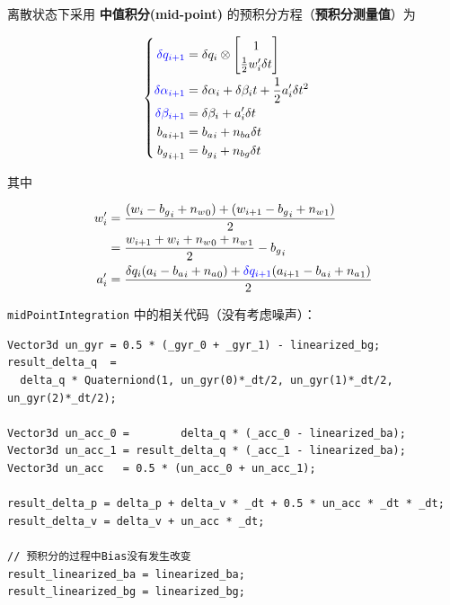 \documentclass[12pt,a4paper]{article}
\begin{document}
离散状态下采用 \textbf{中值积分(mid-point)} 的预积分方程（\textbf{预积分测量值}）为

\begin{equation}
\label{equ:preinte_measure}
\begin{cases}
\begin{aligned}
\color{blue}{\delta q_{i+1}} &= 
\delta q_{i} \otimes 
\begin{bmatrix} 1 \\ \frac{1}{2} w_{i}' \delta t \end{bmatrix} \\
\color{blue}{\delta\alpha_{i+1}} &= 
\delta\alpha_{i} + \delta\beta_{i}t + \frac{1}{2}a_{i}'\delta t^{2} \\
\color{blue}{\delta\beta_{i+1}} &= 
\delta\beta_{i}+a_{i}' \delta t \\
{b_a}_{i+1} &= {b_a}_i + n_{ba} \delta t \\
{b_g}_{i+1} &= {b_g}_i + n_{bg} \delta t
\end{aligned}
\end{cases}
\end{equation}

其中

\begin{equation}
\begin{aligned}
w_{i}' &= \frac{(w_i-{b_g}_i+{n_w}_0)+(w_{i+1}-{b_g}_i+{n_w}_1)}{2} \\
       &= \frac{w_{i+1}+w_{i}+{n_w}_0+{n_w}_1}{2}-{b_g}_i \\
a_{i}' &= \frac{
  \delta q_{i} (a_{i}-{b_a}_i+{n_a}_0)+
  {\color{blue}{\delta q_{i+1}}}(a_{i+1}-{b_a}_i+{n_a}_1)}{2}
\end{aligned}
\end{equation}

\verb|midPointIntegration| 中的相关代码（没有考虑噪声）：  

\begin{lstlisting}
Vector3d un_gyr = 0.5 * (_gyr_0 + _gyr_1) - linearized_bg;
result_delta_q  = 
  delta_q * Quaterniond(1, un_gyr(0)*_dt/2, un_gyr(1)*_dt/2, un_gyr(2)*_dt/2);

Vector3d un_acc_0 =        delta_q * (_acc_0 - linearized_ba);
Vector3d un_acc_1 = result_delta_q * (_acc_1 - linearized_ba);
Vector3d un_acc   = 0.5 * (un_acc_0 + un_acc_1);

result_delta_p = delta_p + delta_v * _dt + 0.5 * un_acc * _dt * _dt;
result_delta_v = delta_v + un_acc * _dt;

// 预积分的过程中Bias没有发生改变
result_linearized_ba = linearized_ba;
result_linearized_bg = linearized_bg;
\end{lstlisting}
\end{document}
